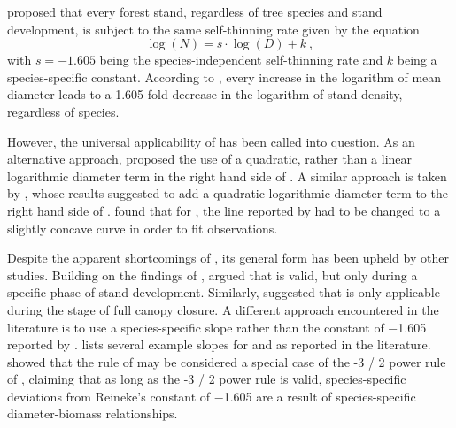 \textcite{Reineke1933} proposed that every forest stand, regardless of tree species and stand development, is subject to the same self-thinning rate given by the equation
\begin{equation}
  \label{eq:reineke}
  \log (N) = s \cdot \log (D) + k ~,
\end{equation}
with \(s = -1.605\) being the species-independent self-thinning rate and \(k\) being a species-specific constant.  According to \textcite{Reineke1933}, every increase in the logarithm of mean diameter leads to a \num{1.605}-fold decrease in the logarithm of stand density, regardless of species.

However, the universal applicability of  has been called into question.  As an alternative approach, \textcite{Charru2012} proposed the use of a quadratic, rather than a linear logarithmic diameter term in the right hand side of . A similar approach is taken by \textcite{Schuetz2008,Schuetz2010,Zeide1995}, whose results suggested to add a quadratic logarithmic diameter term to the right hand side of .  \textcite{Meyer1938} found that for \ponderosa{}, the line reported by \textcite{Reineke1933} had to be changed to a slightly concave curve in order to fit observations.  

Despite the apparent shortcomings of , its general form has been upheld by other studies.  Building on the findings of \textcite{Drew1979}, \textcite{VanderSchaaf2010,VanderSchaaf2008} argued that  is valid, but only during a specific phase of stand development.  Similarly, \textcite{Zeide1985} suggested that  is only applicable during the stage of full canopy closure.  A different approach encountered in the literature is to use a species-specific slope rather than the constant of \num{-1.605} reported by \textcite{Reineke1933} \parencite{MacKinney1935,Pretzsch2005,Charru2012,Pretzsch2006,Río2001,Sterba1987,Vacchiano2013,Vospernik2015,Zeide1985,Zeide1987,VanderSchaaf2007}.   lists several example slopes for \beech{} and \spruce{} as reported in the literature.  \textcite{Pretzsch2000,Pretzsch2002} showed that the rule of \textcite{Reineke1933} may be considered a special case of the \num{-3 / 2} power rule of \textcite{Yoda1963}, claiming that as long as the \num{-3 / 2} power rule is valid, species-specific deviations from Reineke’s constant of \num{-1.605} are a result of species-specific diameter-biomass relationships.

